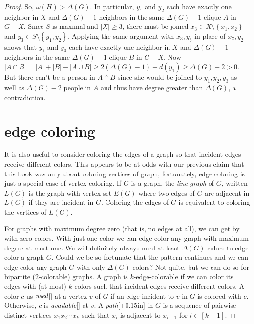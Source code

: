 \documentclass{amsbook}
\newcommand{\aaside}[2]{\marginnote{\scriptsize{#1}}[#2]}
\theoremstyle{plain}
\numberwithin{equation}{chapter}
\newcommand{\set}[1]{\left\{ #1 \right\}}
\newcommand{\card}[1]{\left|#1\right|}
\newcommand{\irange}[1]{\left[#1\right]}
\begin{document}
\begin{proof}
So, $\omega(H) > \Delta(G)$.  In particular, $y_1$ and $y_2$ each have exactly one neighbor in $X$ and $\Delta(G) - 1$ neighbors in the same $\Delta(G) -1$ clique $A$ in $G - X$.
 Since $S$ is maximal and $\card{X} \ge 3$, there must be joined
$x_3 \in X \setminus \set{x_1,x_2}$ and $y_3 \in S \setminus \set{y_1,y_2}$.  Applying the same argument with $x_3, y_3$ in place of $x_2, y_2$ shows
that $y_1$ and $y_3$ each have exactly one neighbor in $X$ and $\Delta(G) - 1$ neighbors in the same $\Delta(G) -1$ clique $B$ in $G - X$.
Now $\card{A\cap B} = \card{A} + \card{B} - \card{A\cup B} \ge 2(\Delta(G) - 1) - d(y_1) \ge \Delta(G) - 2 > 0$.  But there can't be a person
in $A \cap B$ since she would be joined to $y_1,y_2,y_3$ as well as $\Delta(G) - 2$ people in $A$ and thus have degree greater than $\Delta(G)$, a contradiction. 

\chapter*{edge coloring}
It is also useful to consider coloring the edges of a graph so that incident edges receive different colors.  This
appears to be at odds with our previous claim that this book was only about coloring vertices of graph; fortunately, edge coloring
is just a special case of vertex coloring.  If $G$ is a graph, the \emph{line graph} of $G$, written
$L(G)$ is the graph with vertex set $E(G)$ where two edges of $G$ are adjacent in $L(G)$ if they are incident in $G$.  Coloring
the edges of $G$ is equivalent to coloring the vertices of $L(G)$.

For graphs with maximum degree zero (that is, no edges at all), we can get by with zero colors.  
With just one color we can edge color any graph with maximum degree at most one.  We will definitely always need at least $\Delta(G)$ colors
to edge color a graph $G$.  Could we be so fortunate that the pattern continues
and we can edge color any graph $G$ with only $\Delta(G)$-colors? Not quite, but we can do so for bipartite ($2$-colorable) graphs.
A graph is $k$-edge-colorable if we can color its edges with (at most) $k$ colors such that incident edges receive different colors.
A color $c$ us $\emph{used}$\aaside{used}{} at a vertex $v$ of $G$ if an edge incident to $v$ in $G$ is colored with $c$. Otherwise, $c$ is \emph{available}\aaside{available}{} at $v$.
A \emph{path}\aaside{path}{+0.15in} in $G$ is a sequence of pairwise distinct vertices $x_1x_2\cdots x_k$ such that $x_i$ is adjacent to $x_{i+1}$ for $i \in \irange{k-1}$.


\end{proof}
\end{document}
